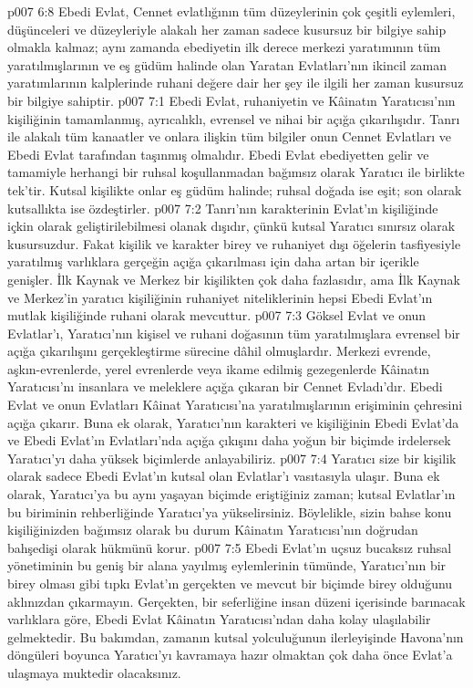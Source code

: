 \vs p007 6:8 Ebedi Evlat, Cennet evlatlığının tüm düzeylerinin çok çeşitli eylemleri, düşünceleri ve düzeyleriyle alakalı her zaman sadece kusursuz bir bilgiye sahip olmakla kalmaz; aynı zamanda ebediyetin ilk derece merkezi yaratımının tüm yaratılmışlarının ve eş güdüm halinde olan Yaratan Evlatları’nın ikincil zaman yaratımlarının kalplerinde ruhani değere dair her şey ile ilgili her zaman kusursuz bir bilgiye sahiptir.
\vs p007 7:1 Ebedi Evlat, ruhaniyetin ve Kâinatın Yaratıcısı’nın kişiliğinin tamamlanmış, ayrıcalıklı, evrensel ve nihai bir açığa çıkarılışıdır. Tanrı ile alakalı tüm kanaatler ve onlara ilişkin tüm bilgiler onun Cennet Evlatları ve Ebedi Evlat tarafından taşınmış olmalıdır. Ebedi Evlat ebediyetten gelir ve tamamiyle herhangi bir ruhsal koşullanmadan bağımsız olarak Yaratıcı ile birlikte tek’tir. Kutsal kişilikte onlar eş güdüm halinde; ruhsal doğada ise eşit; son olarak kutsallıkta ise özdeştirler.
\vs p007 7:2 Tanrı’nın karakterinin Evlat’ın kişiliğinde içkin olarak geliştirilebilmesi olanak dışıdır, çünkü kutsal Yaratıcı sınırsız olarak kusursuzdur. Fakat kişilik ve karakter birey ve ruhaniyet dışı öğelerin tasfiyesiyle yaratılmış varlıklara gerçeğin açığa çıkarılması için daha artan bir içerikle genişler. İlk Kaynak ve Merkez bir kişilikten çok daha fazlasıdır, ama İlk Kaynak ve Merkez’in yaratıcı kişiliğinin ruhaniyet niteliklerinin hepsi Ebedi Evlat’ın mutlak kişiliğinde ruhani olarak mevcuttur.
\vs p007 7:3 Göksel Evlat ve onun Evlatlar’ı, Yaratıcı’nın kişisel ve ruhani doğasının tüm yaratılmışlara evrensel bir açığa çıkarılışını gerçekleştirme sürecine dâhil olmuşlardır. Merkezi evrende, aşkın\hyp{}evrenlerde, yerel evrenlerde veya ikame edilmiş gezegenlerde Kâinatın Yaratıcısı’nı insanlara ve meleklere açığa çıkaran bir Cennet Evladı’dır. Ebedi Evlat ve onun Evlatları Kâinat Yaratıcısı’na yaratılmışlarının erişiminin çehresini açığa çıkarır. Buna ek olarak, Yaratıcı’nın karakteri ve kişiliğinin Ebedi Evlat’da ve Ebedi Evlat’ın Evlatları’nda açığa çıkışını daha yoğun bir biçimde irdelersek Yaratıcı’yı daha yüksek biçimlerde anlayabiliriz.
\vs p007 7:4 Yaratıcı size bir kişilik olarak sadece Ebedi Evlat’ın kutsal olan Evlatlar’ı vasıtasıyla ulaşır. Buna ek olarak, Yaratıcı’ya bu aynı yaşayan biçimde eriştiğiniz zaman; kutsal Evlatlar’ın bu biriminin rehberliğinde Yaratıcı’ya yükselirsiniz. Böylelikle, sizin bahse konu kişiliğinizden bağımsız olarak bu durum Kâinatın Yaratıcısı’nın doğrudan bahşedişi olarak hükmünü korur.
\vs p007 7:5 Ebedi Evlat’ın uçsuz bucaksız ruhsal yönetiminin bu geniş bir alana yayılmış eylemlerinin tümünde, Yaratıcı’nın bir birey olması gibi tıpkı Evlat’ın gerçekten ve mevcut bir biçimde birey olduğunu aklınızdan çıkarmayın. Gerçekten, bir seferliğine insan düzeni içerisinde barınacak varlıklara göre, Ebedi Evlat Kâinatın Yaratıcısı’ndan daha kolay ulaşılabilir gelmektedir. Bu bakımdan, zamanın kutsal yolculuğunun ilerleyişinde Havona’nın döngüleri boyunca Yaratıcı’yı kavramaya hazır olmaktan çok daha önce Evlat’a ulaşmaya muktedir olacaksınız.
